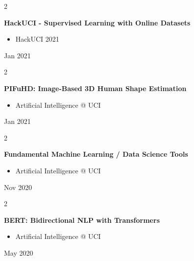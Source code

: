 \documentclass[10pt, letterpaper]{article}
\newenvironment{highlights}{
    \begin{itemize}[
        topsep=0.10 cm,
        parsep=0.10 cm,
        partopsep=0pt,
        itemsep=0pt,
        leftmargin=0.4 cm + 10pt
    ]
}{
    \end{itemize}
} %
\newenvironment{twocolentry}[2][]{
    \onecolentry
    \def\secondColumn{#2}
    \setcolumnwidth{\fill, 4.5 cm}
    \begin{paracol}{2}
}{
    \switchcolumn \raggedleft \secondColumn
    \end{paracol}
    \endonecolentry
} %
\begin{document}
        \begin{twocolentry}{
            Jan 2021
        }
            \textbf{HackUCI - Supervised Learning with Online Datasets}
            \begin{highlights}
                \item HackUCI 2021
            \end{highlights}
        \end{twocolentry}


        \vspace{0.2 cm}

        \begin{twocolentry}{
            Jan 2021
        }
            \textbf{PIFuHD: Image-Based 3D Human Shape Estimation}
            \begin{highlights}
                \item Artificial Intelligence @ UCI
            \end{highlights}
        \end{twocolentry}


        \vspace{0.2 cm}

        \begin{twocolentry}{
            Nov 2020
        }
            \textbf{Fundamental Machine Learning / Data Science Tools}
            \begin{highlights}
                \item Artificial Intelligence @ UCI
            \end{highlights}
        \end{twocolentry}


        \vspace{0.2 cm}

        \begin{twocolentry}{
            May 2020
        }
            \textbf{BERT: Bidirectional NLP with Transformers}
            \begin{highlights}
                \item Artificial Intelligence @ UCI
            \end{highlights}
        \end{twocolentry}



    
\end{document}
